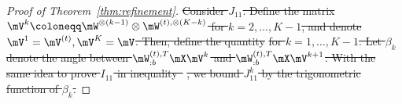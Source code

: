 \documentclass[lettersize,onecolumn,journal]{IEEEtran}
\theoremstyle{definition}
\theoremstyle{definition}
\def\fixme#1#2{\textbf{\color{red}[FIXME (#1): #2]}}
\providecommand{\DIFdeltex}[1]{{\protect\color{red}\sout{#1}}}                      %
\providecommand{\DIFdel}[1]{\texorpdfstring{\DIFdeltex{#1}}{}} %
\begin{document}
\begin{proof}[Proof of Theorem~\ref{thm:refinement}]

\DIFdel{Consider $J_{11}$.  Define the matrix $\mV^{k} \coloneqq \mW^{\otimes (k-1)} \otimes \mW^{(t), \otimes (K-k)}$ for $k = 2,\ldots, K-1$, and denote $\mV^1 = \mV^{(t)}, \mV^K = \mV$. Then, define the quantity
    }%
\DIFdel{for $k = 1,\ldots, K-1$. Let $\beta_k$ denote the angle between $\mW_{:b}^{(t),T} \mX \mV^k$ and $\mW_{:b}^{(t),T} \mX \mV^{k+1}$. With the same idea to prove $I_{11}$ in inequality~}%
\DIFdel{, we bound $J_{11}^k$ by the trigonometric function of $\beta_k$. 
    }%


\end{proof}
\end{document}
